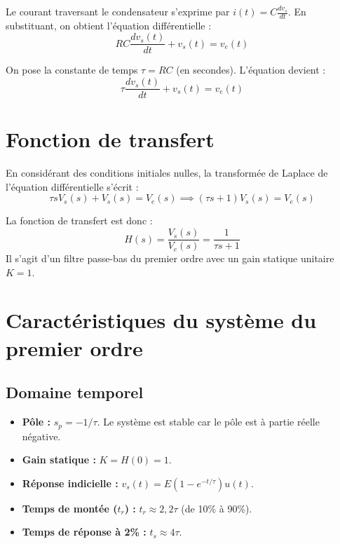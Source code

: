\documentclass[12pt,a4paper]{article}
\begin{document}
	Le courant traversant le condensateur s'exprime par $i(t) = C \frac{dv_s}{dt}$. En substituant, on obtient l'équation différentielle :
	\begin{equation}
	RC \frac{dv_s(t)}{dt} + v_s(t) = v_e(t)
	\end{equation}
	
	On pose la constante de temps $\tau = RC$ (en secondes). L'équation devient :
	\begin{equation}
	\tau \frac{dv_s(t)}{dt} + v_s(t) = v_e(t)
	\end{equation}
	
	\section{Fonction de transfert}
	En considérant des conditions initiales nulles, la transformée de Laplace de l'équation différentielle s'écrit :
	\begin{equation*}
	\tau s V_s(s) + V_s(s) = V_e(s) \implies (\tau s + 1) V_s(s) = V_e(s)
	\end{equation*}
	
	La fonction de transfert est donc :
	\begin{equation}
	H(s) = \frac{V_s(s)}{V_e(s)} = \frac{1}{\tau s + 1}
	\end{equation}
	Il s'agit d'un filtre passe-bas du premier ordre avec un gain statique unitaire $K=1$.
	
	\section{Caractéristiques du système du premier ordre}
	
	\subsection{Domaine temporel}
	\begin{itemize}
		\item \textbf{Pôle :} $s_p = -1/\tau$. Le système est stable car le pôle est à partie réelle négative.
		\item \textbf{Gain statique :} $K = H(0) = 1$.
		\item \textbf{Réponse indicielle :} $v_s(t) = E(1 - e^{-t/\tau}) u(t)$.
		\item \textbf{Temps de montée ($t_r$) :} $t_r \approx 2,2\tau$ (de 10\% à 90\%).
		\item \textbf{Temps de réponse à 2\% :} $t_s \approx 4\tau$.
	\end{itemize}
	
\end{document}
